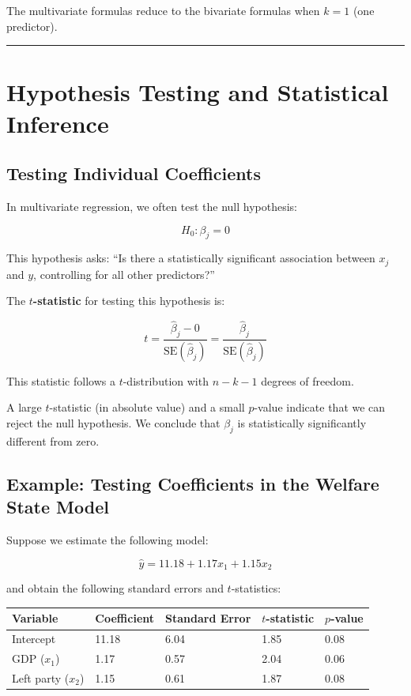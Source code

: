 \documentclass[
  letterpaper,
  DIV=11,
  numbers=noendperiod]{scrreprt}
\begin{document}
The multivariate formulas reduce to the bivariate formulas when
\(k = 1\) (one predictor).

\begin{center}\rule{0.5\linewidth}{0.5pt}\end{center}

\section{Hypothesis Testing and Statistical
Inference}\label{hypothesis-testing-and-statistical-inference}

\subsection{Testing Individual
Coefficients}\label{testing-individual-coefficients}

In multivariate regression, we often test the null hypothesis:

\[
H_0: \beta_j = 0
\]

This hypothesis asks: ``Is there a statistically significant association
between \(x_j\) and \(y\), controlling for all other predictors?''

The \textbf{\(t\)-statistic} for testing this hypothesis is:

\[
t = \frac{\hat{\beta}_j - 0}{\text{SE}(\hat{\beta}_j)} = \frac{\hat{\beta}_j}{\text{SE}(\hat{\beta}_j)}
\]

This statistic follows a \(t\)-distribution with \(n - k - 1\) degrees
of freedom.

A large \(t\)-statistic (in absolute value) and a small \(p\)-value
indicate that we can reject the null hypothesis. We conclude that
\(\beta_j\) is statistically significantly different from zero.

\subsection{Example: Testing Coefficients in the Welfare State
Model}\label{example-testing-coefficients-in-the-welfare-state-model}

Suppose we estimate the following model:

\[
\hat{y} = 11.18 + 1.17 x_1 + 1.15 x_2
\]

and obtain the following standard errors and \(t\)-statistics:

\begin{longtable}[]{@{}lllll@{}}
\toprule\noalign{}
Variable & Coefficient & Standard Error & \(t\)-statistic &
\(p\)-value \\
\midrule\noalign{}
\endhead
\bottomrule\noalign{}
\endlastfoot
Intercept & 11.18 & 6.04 & 1.85 & 0.08 \\
GDP (\(x_1\)) & 1.17 & 0.57 & 2.04 & 0.06 \\
Left party (\(x_2\)) & 1.15 & 0.61 & 1.87 & 0.08 \\
\end{longtable}
\end{document}

